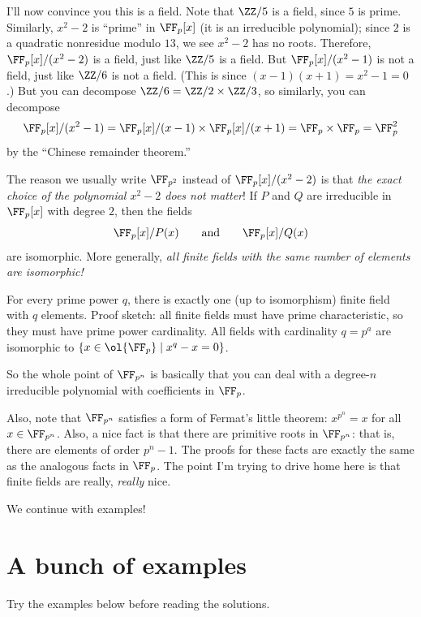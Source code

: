 \documentclass[11pt]{scrartcl}
\begin{document}
I'll now convince you this is a field. Note that $\ZZ/5$ is a field, since $5$ is prime. Similarly, $x^2 - 2$ is ``prime'' in $\FF_p[x]$ (it is an irreducible polynomial); since $2$ is a quadratic nonresidue modulo $13$, we see $x^2 - 2$ has no roots. Therefore, $\FF_p[x]/(x^2 - 2)$ is a field, just like $\ZZ/5$ is a field. But $\FF_p[x]/(x^2 - 1)$ is not a field, just like $\ZZ/6$ is not a field. (This is since $(x - 1)(x + 1) = x^2 - 1 = 0$.) But you can decompose $\ZZ/6 = \ZZ/2 \times \ZZ/3$, so similarly, you can decompose
\[\FF_p[x]/(x^2 - 1) = \FF_p[x]/(x - 1) \times \FF_p[x]/(x + 1) = \FF_p \times \FF_p = \FF_p^2\]
by the ``Chinese remainder theorem.''

\begin{remark*}
    The reason we usually write $\FF_{p^2}$ instead of $\FF_p[x]/(x^2 - 2)$ is that \emph{the exact choice of the polynomial $x^2 - 2$ does not matter}! If $P$ and $Q$ are irreducible in $\FF_p[x]$ with degree $2$, then the fields
    \[\FF_p[x]/P(x) \qquad \text{and} \qquad \FF_p[x]/Q(x)\]
    are isomorphic. More generally, \emph{all finite fields with the same number of elements are isomorphic!}
    
    For every prime power $q$, there is exactly one (up to isomorphism) finite field with $q$ elements. Proof sketch: all finite fields must have prime characteristic, so they must have prime power cardinality. All fields with cardinality $q = p^a$ are isomorphic to $\{x \in \ol{\FF_p} \mid x^q - x = 0\}$.
\end{remark*}

So the whole point of $\FF_{p^n}$ is basically that you can deal with a degree-$n$ irreducible polynomial with coefficients in $\FF_p$.

Also, note that $\FF_{p^n}$ satisfies a form of Fermat's little theorem: $x^{p^n} = x$ for all $x \in \FF_{p^n}$. Also, a nice fact is that there are primitive roots in $\FF_{p^n}$: that is, there are elements of order $p^n - 1$. The proofs for these facts are exactly the same as the analogous facts in $\FF_p$. The point I'm trying to drive home here is that finite fields are really, \emph{really} nice.

We continue with examples!

\section{A bunch of examples}

Try the examples below before reading the solutions.
\end{document}
